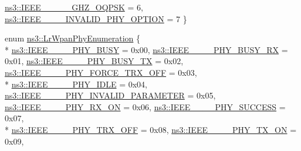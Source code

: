 \begin{DoxyCompactItemize}
\hyperlink{group__lr-wpan_gga23ee18bb5f5136211c75a7f58673db52a9be398dcb297b75dd1bdfbbc30eb80fc}{ns3\+::\+I\+E\+E\+E\+\_\+\_\+\_\+\_\+\_\+G\+H\+Z\+\_\+\+O\+Q\+P\+SK} = 6, 
\hyperlink{group__lr-wpan_gga23ee18bb5f5136211c75a7f58673db52aecbdd68205278c9970eaf3af44c42bfd}{ns3\+::\+I\+E\+E\+E\+\_\+\_\+\_\+\_\+\+I\+N\+V\+A\+L\+I\+D\+\_\+\+P\+H\+Y\+\_\+\+O\+P\+T\+I\+ON} = 7
 \}
\item 
enum \hyperlink{group__lr-wpan_ga6494269d13d45c511a07b7ccbb1de754}{ns3\+::\+Lr\+Wpan\+Phy\+Enumeration} \{ \\*
\hyperlink{group__lr-wpan_gga6494269d13d45c511a07b7ccbb1de754a14641e5190b66ec8ec3903218058dc46}{ns3\+::\+I\+E\+E\+E\+\_\+\_\+\_\+\_\+\+P\+H\+Y\+\_\+\+B\+U\+SY} = 0x00, 
\hyperlink{group__lr-wpan_gga6494269d13d45c511a07b7ccbb1de754a09f430974fda07ac7d4d483a1ce23b98}{ns3\+::\+I\+E\+E\+E\+\_\+\_\+\_\+\_\+\+P\+H\+Y\+\_\+\+B\+U\+S\+Y\+\_\+\+RX} = 0x01, 
\hyperlink{group__lr-wpan_gga6494269d13d45c511a07b7ccbb1de754a87f658959801356265b8c28a85569b15}{ns3\+::\+I\+E\+E\+E\+\_\+\_\+\_\+\_\+\+P\+H\+Y\+\_\+\+B\+U\+S\+Y\+\_\+\+TX} = 0x02, 
\hyperlink{group__lr-wpan_gga6494269d13d45c511a07b7ccbb1de754a878a570a6caffa060865d60b3f92cc09}{ns3\+::\+I\+E\+E\+E\+\_\+\_\+\_\+\_\+\+P\+H\+Y\+\_\+\+F\+O\+R\+C\+E\+\_\+\+T\+R\+X\+\_\+\+O\+FF} = 0x03, 
\\*
\hyperlink{group__lr-wpan_gga6494269d13d45c511a07b7ccbb1de754af3994414efcd2fac7e312ecb9b3ebd70}{ns3\+::\+I\+E\+E\+E\+\_\+\_\+\_\+\_\+\+P\+H\+Y\+\_\+\+I\+D\+LE} = 0x04, 
\hyperlink{group__lr-wpan_gga6494269d13d45c511a07b7ccbb1de754ac611b9c3a3136400c3d47c6bee4e452d}{ns3\+::\+I\+E\+E\+E\+\_\+\_\+\_\+\_\+\+P\+H\+Y\+\_\+\+I\+N\+V\+A\+L\+I\+D\+\_\+\+P\+A\+R\+A\+M\+E\+T\+ER} = 0x05, 
\hyperlink{group__lr-wpan_gga6494269d13d45c511a07b7ccbb1de754a9480f69fea1a74b7961ed74d6b3e2f9e}{ns3\+::\+I\+E\+E\+E\+\_\+\_\+\_\+\_\+\+P\+H\+Y\+\_\+\+R\+X\+\_\+\+ON} = 0x06, 
\hyperlink{group__lr-wpan_gga6494269d13d45c511a07b7ccbb1de754a2a81d56261f039e08cf2dd91de10b618}{ns3\+::\+I\+E\+E\+E\+\_\+\_\+\_\+\_\+\+P\+H\+Y\+\_\+\+S\+U\+C\+C\+E\+SS} = 0x07, 
\\*
\hyperlink{group__lr-wpan_gga6494269d13d45c511a07b7ccbb1de754a4c0fd3882b68301deb8ce5b03109058f}{ns3\+::\+I\+E\+E\+E\+\_\+\_\+\_\+\_\+\+P\+H\+Y\+\_\+\+T\+R\+X\+\_\+\+O\+FF} = 0x08, 
\hyperlink{group__lr-wpan_gga6494269d13d45c511a07b7ccbb1de754aa595d552b56b89b363b800b9fcfbe67f}{ns3\+::\+I\+E\+E\+E\+\_\+\_\+\_\+\_\+\+P\+H\+Y\+\_\+\+T\+X\+\_\+\+ON} = 0x09, 

\end{DoxyCompactItemize}
